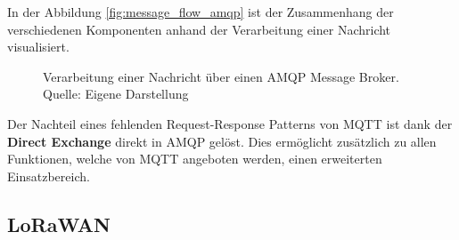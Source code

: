 In der Abbildung \vref{fig:message_flow_amqp} ist der Zusammenhang der verschiedenen Komponenten anhand der Verarbeitung einer Nachricht visualisiert.

\begin{figure}
    \centering
    \caption{Verarbeitung einer Nachricht über einen \ac{AMQP} Message Broker.\\Quelle: Eigene Darstellung}
    \label{fig:message_flow_amqp}
\end{figure}

Der Nachteil eines fehlenden Request-Response Patterns von \ac{MQTT} ist dank der \textbf{Direct Exchange} direkt in \ac{AMQP} gelöst. Dies ermöglicht zusätzlich zu allen Funktionen, welche von \ac{MQTT} angeboten werden, einen erweiterten Einsatzbereich.

\subsection{LoRaWAN}


